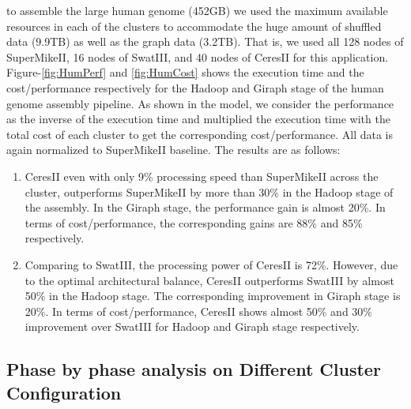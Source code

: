 \documentclass[journal]{IEEEtran}
\begin{document}
to assemble the large human genome (452GB) we used the maximum available resources in each of the clusters to accommodate the huge amount of shuffled data (9.9TB) as well as the graph data (3.2TB). That is, we used all 128 nodes of SuperMikeII, 16 nodes of SwatIII, and 40 nodes of CeresII for this application. Figure-\ref{fig:HumPerf} and \ref{fig:HumCost} shows the execution time and the cost/performance respectively for the Hadoop and Giraph stage of the human genome assembly pipeline. As shown in the model, we consider the performance as the inverse of the execution time and multiplied the execution time with the total cost of each cluster to get the corresponding cost/performance. All data is again normalized to SuperMikeII baseline. The results are as follows:
\begin{enumerate}
\item CeresII even with only 9\% processing speed than SuperMikeII across the cluster, outperforms SuperMikeII by more than 30\% in the Hadoop stage of the assembly. In the Giraph stage, the performance gain is almost 20\%. In terms of cost/performance, the corresponding gains are 88\% and 85\% respectively. 
\item Comparing to SwatIII,  the processing power of CeresII is 72\%. However,  due to the optimal architectural balance, CeresII outperforms SwatIII by almost 50\% in the Hadoop stage. The corresponding improvement in Giraph stage is 20\%. In terms of cost/performance, CeresII shows almost 50\% and 30\% improvement over SwatIII for Hadoop and Giraph stage respectively.
\end{enumerate}

\subsection{Phase by phase analysis on Different Cluster Configuration}
%
%
\end{document}
